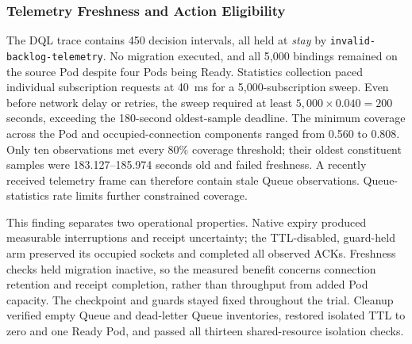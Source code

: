 \subsubsection{Telemetry Freshness and Action Eligibility}

The DQL trace contains 450 decision intervals, all held at \emph{stay} by
\texttt{invalid-backlog-telemetry}. No migration executed, and all 5,000 bindings
remained on the source Pod despite four Pods being Ready. Statistics collection
paced individual subscription requests at 40~ms for a 5,000-subscription sweep.
Even before network delay or retries, the sweep required at least
$5{,}000\times0.040=200$ seconds, exceeding the 180-second oldest-sample deadline.
The minimum coverage across the Pod and occupied-connection components ranged
from 0.560 to 0.808. Only ten observations met every 80\% coverage threshold;
their oldest constituent samples were 183.127--185.974 seconds old and failed
freshness. A recently received telemetry frame can therefore contain stale
Queue observations. Queue-statistics rate limits further constrained coverage.

This finding separates two operational properties. Native expiry produced
measurable interruptions and receipt uncertainty; the TTL-disabled, guard-held
arm preserved its occupied sockets and completed all observed ACKs. Freshness
checks held migration inactive, so the measured benefit concerns connection
retention and receipt completion, rather than throughput from added Pod
capacity. The checkpoint and guards stayed fixed throughout the trial.
Cleanup verified empty Queue and
dead-letter Queue inventories, restored isolated TTL to zero and one Ready Pod,
and passed all thirteen shared-resource isolation checks.
\FloatBarrier
